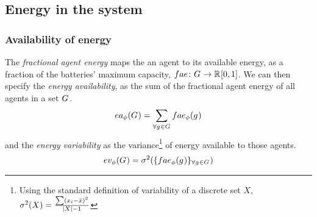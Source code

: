 \newcommand{\formalAgentEnergyAvailable}[2]{
	\functionFormal{fae}
	{\setAgents{}{}}
	{\setRealNumbersUnit{}{}}
}
\newcommand{\functionAgentEnergyAvailable}[2]{
	\functionSignature{fae_{\varTime{}{}}}
	{\varAgent{}{}}
}


\subsection{Energy in the system}
\newcommand{\functionEnergyVariability}[2]{
\ifx \\#1\\
	\functionSignature{ev_{\varTime{}{}}}
	{\setAgents{}{}}
\else
	\functionSignature{ev_{\varTime{}{}}}{#1}
\fi
}
\newcommand{\functionEnergyAvailable}[2]{
\ifx \\#1\\
	\functionSignature{ea_{\varTime{}{}}}{\setAgents{}{}}
\else
	\functionSignature{ea_{\varTime{}{}}}{#1}
\fi
}
\subsubsection{Availability of energy}

The \textit{fractional agent energy} maps the an agent to its available energy, as a fraction of the batteries' maximum capacity, $\formalAgentEnergyAvailable{}{}$. We can then specify the \textit{energy availability}, as the sum of the fractional agent energy of all agents in a set $G_{}^{}$.
	\begin{equation}
		\functionEnergyAvailable{}{} 
		= \sum_{\forall \varAgent{}{} \in \setAgents{}{}} \functionAgentEnergyAvailable{\varAgent{i}{}}{}
	\end{equation}
and the \textit{energy variability} as the variance\footnote{Using the standard definition of variability of a discrete set $X$, $\sigma^2(X) = \frac{\sum (x_i - \bar{x})^2}{\lvert X \rvert-1}$} of energy available to those agents.
	\begin{equation}     	
		\functionEnergyVariability{}{} 
		= \sigma^2(
			\lbrace \functionAgentEnergyAvailable{}{}
			\rbrace_{\forall \varAgent{}{} \in \setAgents{}{}}
		)
	\end{equation}

